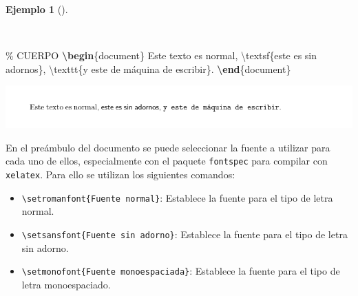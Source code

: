 \documentclass[
  a4paper,
]{scrreport}
\newenvironment{Shaded}{\begin{snugshade}}{\end{snugshade}}
\newcommand{\CommentTok}[1]{\textcolor[rgb]{0.37,0.37,0.37}{#1}}
\newcommand{\ExtensionTok}[1]{\textcolor[rgb]{0.00,0.23,0.31}{#1}}
\newcommand{\FunctionTok}[1]{\textcolor[rgb]{0.28,0.35,0.67}{#1}}
\newcommand{\KeywordTok}[1]{\textcolor[rgb]{0.00,0.23,0.31}{\textbf{#1}}}
\newcommand{\NormalTok}[1]{\textcolor[rgb]{0.00,0.23,0.31}{#1}}
\providecommand{\tightlist}{%
  \setlength{\itemsep}{0pt}\setlength{\parskip}{0pt}}\usepackage{longtable,booktabs,array}
\theoremstyle{definition}
\newtheorem{example}{Ejemplo}[chapter]
\theoremstyle{remark}
\begin{document}
\begin{example}[]\protect\hypertarget{exm-familias-letra}{}\label{exm-familias-letra}

~

\begin{Shaded}
\begin{Highlighting}[]
\CommentTok{\% CUERPO}
\KeywordTok{\textbackslash{}begin}\NormalTok{\{}\ExtensionTok{document}\NormalTok{\}}
\NormalTok{Este texto es normal, }\FunctionTok{\textbackslash{}textsf}\NormalTok{\{este es sin adornos\}, }\FunctionTok{\textbackslash{}texttt}\NormalTok{\{y este de máquina de escribir\}.}
\KeywordTok{\textbackslash{}end}\NormalTok{\{}\ExtensionTok{document}\NormalTok{\}}
\end{Highlighting}
\end{Shaded}

\begin{tcolorbox}[enhanced jigsaw, colframe=quarto-callout-note-color-frame, opacityback=0, title={Salida}, bottomrule=.15mm, left=2mm, coltitle=black, arc=.35mm, leftrule=.75mm, colback=white, rightrule=.15mm, colbacktitle=quarto-callout-note-color!10!white, toprule=.15mm, breakable, opacitybacktitle=0.6, bottomtitle=1mm, toptitle=1mm, titlerule=0mm]

\includegraphics{img/formateo/tipos-letra.png}

\end{tcolorbox}

\end{example}

En el preámbulo del documento se puede seleccionar la fuente a utilizar
para cada uno de ellos, especialmente con el paquete \texttt{fontspec}
para compilar con \texttt{xelatex}. Para ello se utilizan los siguientes
comandos:

\begin{itemize}
\tightlist
\item
  \texttt{\textbackslash{}setromanfont\{Fuente\ normal\}}: Establece la
  fuente para el tipo de letra normal.
\item
  \texttt{\textbackslash{}setsansfont\{Fuente\ sin\ adorno\}}: Establece
  la fuente para el tipo de letra sin adorno.
\item
  \texttt{\textbackslash{}setmonofont\{Fuente\ monoespaciada\}}:
  Establece la fuente para el tipo de letra monoespaciado.
\end{itemize}
\end{document}
